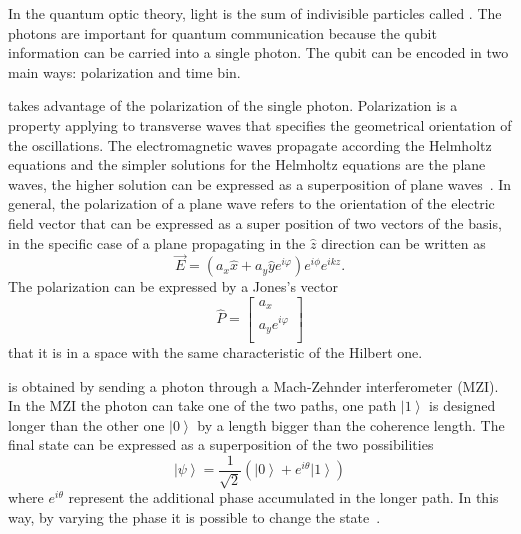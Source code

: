In the quantum optic theory, light is the sum of indivisible particles called . The photons are important for quantum communication because the qubit information can be carried into a single photon. The qubit can be encoded in two main ways: polarization and time bin.

 takes advantage of the polarization of the single photon. Polarization is a property applying to transverse waves that specifies the geometrical orientation of the oscillations. The electromagnetic waves propagate according the Helmholtz equations and the simpler solutions for the Helmholtz equations are the plane waves, the higher solution can be expressed as a superposition of plane waves~\cite{a21}. In general, the polarization of a plane wave refers to the orientation of the electric field vector that can be expressed as a super position of two vectors of the basis, in the specific case of a plane propagating in the $\hat{z}$ direction can be written as
\begin{equation}
  \vec{E} = (a_x \hat{x} + a_y \hat{y} e^{i \varphi}) e^{i \phi} e^{i k z}.
\end{equation}
The polarization can be expressed by a Jones's vector
\begin{equation}
  \hat{P} = \begin{bmatrix} a_x \\ a_y e^{i\varphi} \\ \end{bmatrix}
\end{equation}
that it is in a space with the same characteristic of the Hilbert one.

 is obtained by sending a photon through a Mach-Zehnder interferometer (MZI). In the MZI the photon can take one of the two paths, one path $\left|1\right>$ is designed longer than the other one $\left|0\right>$ by a length bigger than the coherence length. The final state can be expressed as a superposition of the two possibilities
\begin{equation}
  \left|\psi\right> = \frac{1}{\sqrt{2}} (\left|0\right> + e^{i\theta}\left|1\right>)
\end{equation}
where $e^{i \theta}$ represent the additional phase accumulated in the longer path. In this way, by varying the phase it is possible to change the state~\cite{a22}.

